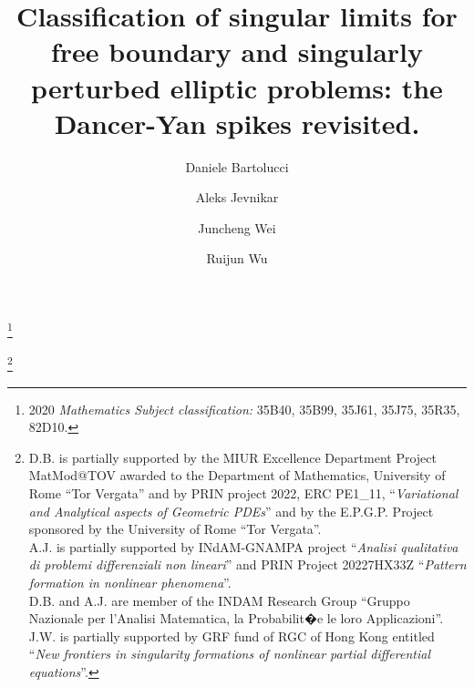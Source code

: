 \documentclass[10pt]{amsart}
\begin{document}
\parindent=0pt
\hfuzz=2pt
\frenchspacing



\title[Dancer-Yan Spikes revisited]{Classification of singular limits for free boundary and singularly perturbed elliptic problems:
the Dancer-Yan spikes revisited.}



\thanks{2020 \textit{Mathematics Subject classification:} 35B40, 35B99, 35J61, 35J75, 35R35, 82D10.}


\author[D. Bartolucci]{Daniele Bartolucci}
\address{Daniele Bartolucci, Department of Mathematics, University of Rome \emph{"Tor Vergata"}, Via della ricerca scientifica n.1, 00133 Roma.}

\author[A. Jevnikar]{Aleks Jevnikar}
\address{Aleks Jevnikar, Department of Mathematics, Computer Science and Physics, University of Udine, Via delle Scienze 206, 33100 Udine, Italy.}

\author[J. Wei]{Juncheng Wei}
\address{Juncheng Wei, Department of Mathematics, Chinese University of Hong Kong, Shatin, Hong Kong.}

\author[R. Wu]{Ruijun Wu}

\address{Ruijun Wu, School of mathematics and statistics, Beijing Institute of Technology, Zhongguancun South Street No. 5, 100081 Beijing, P.R.China.}




\thanks{ D.B.
is partially supported by the MIUR Excellence Department Project MatMod@TOV
awarded to the Department of Mathematics, University of Rome ``Tor Vergata'' and by PRIN project 2022, ERC PE1\_11,
``{\em Variational and Analytical aspects of Geometric PDEs}'' and by the E.P.G.P. Project sponsored by the University of Rome ``Tor Vergata''. \\
 \indent A.J. is partially supported by INdAM-GNAMPA project ``{\em Analisi qualitativa di problemi differenziali non lineari}'' and PRIN Project 20227HX33Z ``{\em Pattern formation in nonlinear phenomena}''.\\
\indent D.B. and A.J. are member of the INDAM Research Group ``Gruppo Nazionale per l'Analisi Matematica, la Probabilit�e le loro Applicazioni''.\\
\indent J.W. is partially supported by GRF fund of RGC of Hong Kong entitled
``\emph{New frontiers in singularity formations of nonlinear partial differential equations}''.}
\end{document}
